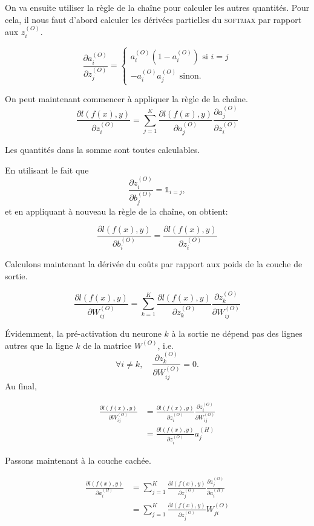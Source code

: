 \documentclass[ebook,10pt,oneside,openany,final, french, a4paper]{memoir}
\begin{document}
\begin{multicols*}{2}[]
On va ensuite utiliser la règle de la chaîne pour calculer les autres 
quantités. 
Pour cela, il nous faut d'abord calculer les dérivées partielles du 
\textsc{softmax} par rapport aux $z^{(O)}_i$.

\[
\frac{\partial a^{(O)}_i}{\partial z^{(O)}_j} = 
\begin{cases}
 a^{(O)}_i (1 - a^{(O)}_i) \text{ si } i = j \\
 -a^{(O)}_i a^{(O)}_j \text{ sinon.}
\end{cases}
\] 

On peut maintenant commencer à appliquer la règle de la chaîne.
\[
\frac{\partial l(f(x), y)}{\partial z^{(O)}_i}
= \sum_{j=1}^{K} \frac{\partial l(f(x), y)}{\partial a^{(O)}_j}
       \frac{\partial a^{(O)}_j}{\partial z^{(O)}_i}
\] 

Les quantités dans la somme sont toutes calculables.

En utilisant le fait que 
\[
\frac{\partial z^{(O)}_i}{\partial b^{(O)}_j} 
  = \mathds{1}_{i=j},
\]
et en appliquant à nouveau la règle de la chaîne, on obtient:

\[
\frac{\partial l(f(x), y)}{\partial b^{(O)}_i}
= \frac{\partial l(f(x), y)}{\partial z^{(O)}_i}
\] 

Calculons maintenant la dérivée du coûts par rapport aux poids 
de la couche de sortie.

\[
\frac{\partial l(f(x), y)}{\partial W^{(O)}_{ij}}
= \sum_{k=1}^{K} \frac{\partial l(f(x), y)}{\partial z^{(O)}_k}
       \frac{\partial z^{(O)}_k}{\partial W^{(O)}_{ij}}
\] 

\'Evidemment, la pré-activation du neurone $k$ à la sortie ne dépend 
pas des lignes autres que la ligne $k$ de la matrice $W^{(O)}$, i.e.\/
\[
\forall i \neq k, \quad \frac{\partial z^{(O)}_k}{\partial W^{(O)}_{ij}} = 0.
\]
Au final, 

\begin{align*}
\frac{\partial l(f(x), y)}{\partial W^{(O)}_{ij}}
  &= \frac{\partial l(f(x), y)}{\partial z^{(O)}_i}
       \frac{\partial z^{(O)}_i}{\partial W^{(O)}_{ij}} \\
  &= \frac{\partial l(f(x), y)}{\partial z^{(O)}_i} a^{(H)}_{j}
\end{align*} 

Passons maintenant à la couche cachée. 

\begin{align*}
\frac{\partial l(f(x), y)}{\partial a^{(H)}_{i}}
  &= \sum_{j=1}^{K} \frac{\partial l(f(x), y)}{\partial z^{(O)}_j}
       \frac{\partial z^{(O)}_j}{\partial a^{(H)}_{i}} \\
  &= \sum_{j=1}^{K} \frac{\partial l(f(x), y)}{\partial z^{(O)}_j}
       W^{(O)}_{ji} \\
\end{align*}


\end{multicols*}
\end{document}
